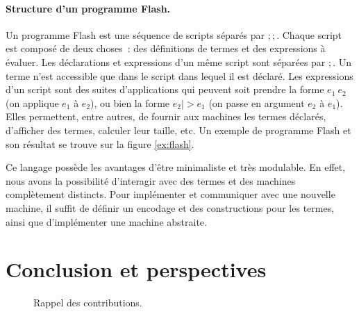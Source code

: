 \documentclass[a4paper, 11pt]{article}
\theoremstyle{definition}
\begin{document}
\paragraph{Structure d'un programme Flash.}
 Un programme Flash est une séquence de scripts séparés par \og$;;$\fg.
 Chaque script est composé de deux choses~: des définitions de termes et des expressions à évaluer.
 Les déclarations et expressions d'un même script sont séparées par \og$;$\fg. 
 Un terme n'est accessible que dans le script dans lequel il est déclaré.
 Les expressions d'un script sont des suites d'applications qui peuvent soit prendre la forme $e_1~e_2$ (on applique $e_1$ à $e_2$),
 ou bien la forme $e_2 |> e_1$ (on passe en argument $e_2$ à $e_1$).
Elles permettent, entre autres, de fournir aux machines les termes déclarés, d'afficher des termes, calculer leur taille, etc.
Un exemple de programme Flash et son résultat se trouve sur la figure \ref{ex:flash}.

Ce langage possède les avantages d'être minimaliste et très modulable. 
En effet, nous avons la possibilité d'interagir avec des termes et des machines complètement distincts. 
Pour implémenter et communiquer avec une nouvelle machine, il suffit de définir un encodage et des constructions pour les termes, ainsi que d'implémenter une machine abstraite.

\section{Conclusion et perspectives}
  \begin{figure}
    \centering
\caption{Rappel des contributions.}
  \end{figure}
\end{document}
